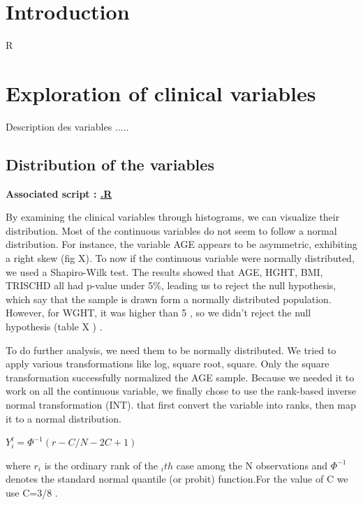 \documentclass[a4paper, 11pt]{article}
\begin{document}
\begin{multicols}{2}

\section{Introduction}
R \citep{R:2024}

\section{Exploration of  clinical variables}
Description des variables .....  

\subsection{Distribution of the variables}

\begin{scriptsize}	
	
	\textbf{Associated script : \href{https://github.com/leopoldguyot/BINF-F401-Project/*}{.R}}
\end{scriptsize}

By examining the clinical variables through histograms, we can visualize their distribution. Most of the continuous variables do not seem to follow a normal distribution. For instance, the variable AGE appears to be asymmetric, exhibiting a right skew (fig X).
To now if the continuous variable were normally distributed, we used a Shapiro-Wilk test. The results showed that AGE, HGHT, BMI, TRISCHD all had p-value under 5\%, leading us to reject the null hypothesis, which say that the sample is drawn form a normally distributed population. However, for WGHT, it was higher than 5 , so we didn’t reject the null hypothesis (table X ) . 

To do further analysis, we need them to be normally distributed. We tried to apply various transformations like log, square root, square. Only the square transformation successfully normalized the AGE sample. 
Because we needed it to work on all the continuous variable, we finally chose to use the rank-based inverse normal transformation (INT). that first convert the variable into ranks, then map it to a normal distribution. 

$ Y^t_{i}=  \Phi^{-1}(r-C/N-2C+1) $

where $r_i$ is the ordinary rank of the $_ith$ case among the N observations and $\Phi^{-1}$ denotes the standard normal quantile (or probit) function.For the value of C we use C=3/8 \citep{beasley2009rank}.


\end{multicols}
\end{document}
